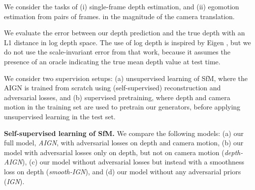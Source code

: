 \documentclass[10pt,twocolumn,letterpaper]{article}
\newcommand\todo[1]{\textcolor{red}{#1}}
\begin{document}
\begin{bibunit}[ieee]
We consider the tasks of (i) single-frame depth estimation, and (ii) egomotion estimation from pairs of frames. 
in the magnitude of the camera translation. 

We evaluate the error between our depth prediction and the true depth with an L1 distance in log depth space. The use of log depth is inspired by Eigen \etal\cite{eigen2014depth}, but we do not use the scale-invariant error from that work, because it assumes the presence of an oracle indicating the true mean depth value at test time. 

We consider two supervision setups: (a) unsupervised learning of SfM, where the AIGN is trained from scratch using  (self-supervised) reconstruction and adversarial losses, and (b) supervised pretraining,  where depth and camera motion in the training set are used to pretrain our generators, before applying unsupervised learning in the test set.

\textbf{Self-supervised learning of SfM.}%
We compare  the following models: (a) our full model, \textit{AIGN}, with adversarial losses on depth and camera motion, (b) our model with adversarial losses only on depth, but not on camera motion (\textit{depth-AIGN}), (c) our model without adversarial losses but instead with a smoothness loss on depth (\textit{smooth-IGN}), and (d) our model without any adversarial priors (\textit{IGN}). 



\end{bibunit}
\end{document}
